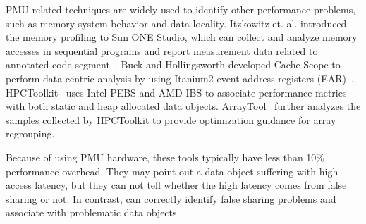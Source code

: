 PMU related techniques are widely used to identify other performance problems, such as memory system behavior and data locality. Itzkowitz et. al. introduced the memory profiling to Sun ONE Studio, which can collect and analyze memory accesses in sequential programs and report measurement data related to annotated code segment~\cite{DBLP:conf/sc/ItzkowitzWAK03}. Buck and Hollingsworth developed Cache Scope to perform data-centric analysis by using Itanium2 event address registers (EAR)~\cite{DBLP:conf/sc/BuckH04}. HPCToolkit~\cite{ibs-sc} uses Intel PEBS and AMD IBS to associate performance metrics with both static and heap allocated data objects. ArrayTool~\cite{ibs-pact} further analyzes the samples collected by HPCToolkit to provide optimization guidance for array regrouping. 

Because of using PMU hardware, these tools typically have less than 10\% performance overhead. They may point out a data object suffering with high access latency, but they can not tell whether the high latency comes from false sharing or not. In contrast, \cheetah{} can correctly identify false sharing problems and associate with problematic data objects.





